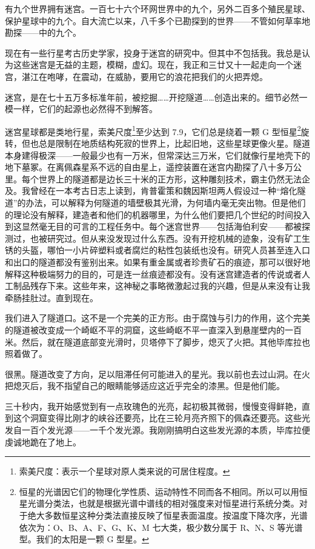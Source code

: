 \documentclass[AutoFakeBold=true]{book}
\begin{document}
有九个世界拥有迷宫。一百七十六个环网世界中的九个，另外二百多个殖民星球、保护星球中的九个。自大流亡以来，八千多个已勘探到的世界——不管如何草率地勘探——中的九个。

现在有一些行星考古历史学家，投身于迷宫的研究中。但其中不包括我。我总是认为这些迷宫是无益的主题，模糊，虚幻。现在，我正和三廿又十一起走向一个迷宫，湛江在咆哮，在震动，在威胁，要用它的浪花把我们的火把弄熄。

迷宫，是在七十五万多标准年前，被挖掘……开挖隧道……创造出来的。细节必然一模一样，它们的起源也必然得不到解答。

迷宫星球都是类地行星，索美尺度\footnote{索美尺度：表示一个星球对原人类来说的可居住程度。}至少达到 7.9，它们总是绕着一颗 G 型恒星\footnote{恒星的光谱因它们的物理化学性质、运动特性不同而各不相同。所以可以用恒星光谱分类法，也就是根据光谱中谱线的相对强度来对恒星进行系统分类。对于绝大多数恒星这种分类法直接反映了恒星表面温度。按温度下降次序，光谱依次为：O、B、A、F、G、K、M 七大类，极少数分属于 R、N、S 等光谱型。我们的太阳是一颗 G 型星。}旋转，但也总是限制在地质结构死寂的世界上，比起旧地，这些星球更像火星。隧道本身建得极深——一般最少也有一万米，但常深达三万米，它们就像行星地壳下的地下墓冢。在离佩森星系不远的自由星上，遥控装置在迷宫内勘探了八十多万公里。每个世界上的隧道都是边长三十米的正方形，这种雕刻技术，霸主仍然无法企及。我曾经在一本考古日志上读到，肯普霍策和魏因斯坦两人假设过一种``熔化隧道''的办法，可以解释为何隧道的墙壁极其光滑，为何墙内毫无突出物。但是他们的理论没有解释，建造者和他们的机器哪里，为什么他们要把几个世纪的时间投入到这显然毫无目的可言的工程任务中。每个迷宫世界——包括海伯利安——都被探测过，也被研究过。但从来没发现过什么东西。没有开挖机械的迹象，没有矿工生锈的头盔，哪怕一小片碎塑料或者腐烂的粘性包装纸也没有。研究人员甚至连入口和出口的隧道都没有鉴别出来。如果有重金属或者珍贵矿石的痕迹，那可以很好地解释这种极端努力的目的，可是连一丝痕迹都没有。没有迷宫建造者的传说或者人工制品残存下来。这些年来，这神秘之事略微激起过我的兴趣，但是从来没有让我牵肠挂肚过。直到现在。

我们进入了隧道口。这不是一个完美的正方形。由于腐蚀与引力的作用，这个完美的隧道被改变成一个崎岖不平的洞窟，这些崎岖不平一直深入到悬崖壁内的一百米。然后，就在隧道底部变光滑时，贝塔停下了脚步，熄灭了火把。其他毕库拉也照着做了。

很黑。隧道改变了方向，足以阻滞任何可能进入的星光。我以前也去过山洞。在火把熄灭后，我不指望自己的眼睛能够适应这近乎完全的漆黑。但是他们能。

三十秒内，我开始感觉到有一点玫瑰色的光亮，起初极其微弱，慢慢变得鲜艳，直到这个洞窟变得比刚才的峡谷还要亮，比在三轮月亮齐照下的佩森还要亮。这些光发自一百个发光源——一千个发光源。我刚刚搞明白这些发光源的本质，毕库拉便虔诚地跪在了地上。
\end{document}
